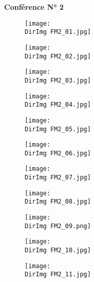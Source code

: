 \documentclass[a4paper,10pt]{article}
\title{}
\author{Florence}
\date{2012-07-11}
\newcommand{\DirImg}{../img/FaivreMartin/}
\begin{document}

\textbf{Conférence N° 2}

\begin{figure}
  \centering
  \texttt{[image: \\DirImg FM2\_01.jpg]}
  \caption{}
  \label{}
\end{figure}
  
\begin{figure}
  \centering
  \texttt{[image: \\DirImg FM2\_02.jpg]}
  \caption{}
  \label{}
\end{figure}

\begin{figure}
  \centering
  \texttt{[image: \\DirImg FM2\_03.jpg]}
  \caption{}
  \label{}
\end{figure}

\begin{figure}
  \centering
  \texttt{[image: \\DirImg FM2\_04.jpg]}
  \caption{}
  \label{}
\end{figure}

\begin{figure}
  \centering
  \texttt{[image: \\DirImg FM2\_05.jpg]}
  \caption{}
  \label{}
\end{figure}

\begin{figure}
  \centering
  \texttt{[image: \\DirImg FM2\_06.jpg]}
  \caption{}
  \label{}
\end{figure}

\begin{figure}
  \centering
  \texttt{[image: \\DirImg FM2\_07.jpg]}
  \caption{}
  \label{}
\end{figure}

\begin{figure}
  \centering
  \texttt{[image: \\DirImg FM2\_08.jpg]}
  \caption{}
  \label{}
\end{figure}

\begin{figure}
  \centering
  \texttt{[image: \\DirImg FM2\_09.png]}
  \caption{}
  \label{}
\end{figure}

\begin{figure}
  \centering
  \texttt{[image: \\DirImg FM2\_10.jpg]}
  \caption{}
  \label{}
\end{figure}

\begin{figure}
  \centering
  \texttt{[image: \\DirImg FM2\_11.jpg]}
  \caption{}
  \label{}
\end{figure}
\end{document}
